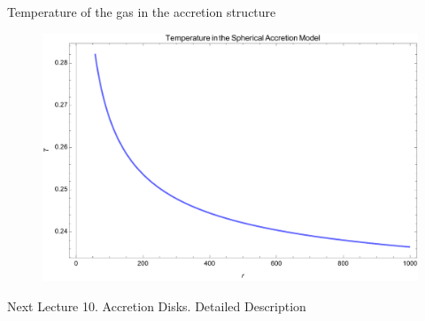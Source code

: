 \documentclass{beamer}
\begin{document}
\begin{frame}{Temperature of the gas in the accretion structure}
	\begin{center}
      \begin{figure}
      	\includegraphics[scale=0.45] {figures/Temperature.pdf}
      \end{figure}
	\end{center}	
\end{frame}

\begin{darkframes}

\begin{frame}{Next Lecture}
  	\Large
	{10. Accretion Disks. Detailed Description}
\end{frame}

  
\end{darkframes}
\end{document}
